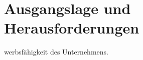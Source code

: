 \chapter{Ausgangslage und Herausforderungen}
\label{cha:AusgangslageundHerausforderungen}
werbsfähigkeit des Unternehmens.